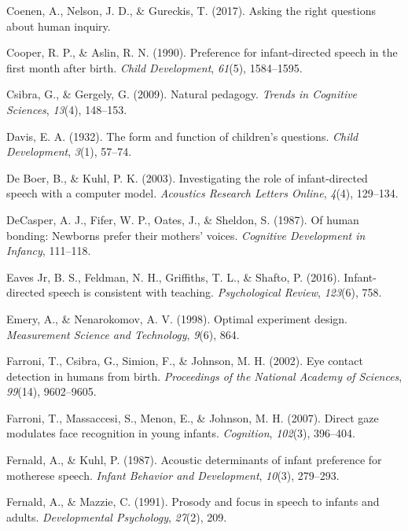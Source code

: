 \documentclass[a4paper,man,apacite,floatsintext]{apa6}
\begin{document}
\hypertarget{ref-coenen2017asking}{}
Coenen, A., Nelson, J. D., \& Gureckis, T. (2017). Asking the right
questions about human inquiry.

\hypertarget{ref-cooper1990preference}{}
Cooper, R. P., \& Aslin, R. N. (1990). Preference for infant-directed
speech in the first month after birth. \emph{Child Development},
\emph{61}(5), 1584--1595.

\hypertarget{ref-csibra2009natural}{}
Csibra, G., \& Gergely, G. (2009). Natural pedagogy. \emph{Trends in
Cognitive Sciences}, \emph{13}(4), 148--153.

\hypertarget{ref-davis1932form}{}
Davis, E. A. (1932). The form and function of children's questions.
\emph{Child Development}, \emph{3}(1), 57--74.

\hypertarget{ref-de2003investigating}{}
De Boer, B., \& Kuhl, P. K. (2003). Investigating the role of
infant-directed speech with a computer model. \emph{Acoustics Research
Letters Online}, \emph{4}(4), 129--134.

\hypertarget{ref-decasper1987human}{}
DeCasper, A. J., Fifer, W. P., Oates, J., \& Sheldon, S. (1987). Of
human bonding: Newborns prefer their mothers' voices. \emph{Cognitive
Development in Infancy}, 111--118.

\hypertarget{ref-eaves2016infant}{}
Eaves Jr, B. S., Feldman, N. H., Griffiths, T. L., \& Shafto, P. (2016).
Infant-directed speech is consistent with teaching. \emph{Psychological
Review}, \emph{123}(6), 758.

\hypertarget{ref-emery1998optimal}{}
Emery, A., \& Nenarokomov, A. V. (1998). Optimal experiment design.
\emph{Measurement Science and Technology}, \emph{9}(6), 864.

\hypertarget{ref-farroni2002eye}{}
Farroni, T., Csibra, G., Simion, F., \& Johnson, M. H. (2002). Eye
contact detection in humans from birth. \emph{Proceedings of the
National Academy of Sciences}, \emph{99}(14), 9602--9605.

\hypertarget{ref-farroni2007direct}{}
Farroni, T., Massaccesi, S., Menon, E., \& Johnson, M. H. (2007). Direct
gaze modulates face recognition in young infants. \emph{Cognition},
\emph{102}(3), 396--404.

\hypertarget{ref-fernald1987acoustic}{}
Fernald, A., \& Kuhl, P. (1987). Acoustic determinants of infant
preference for motherese speech. \emph{Infant Behavior and Development},
\emph{10}(3), 279--293.

\hypertarget{ref-fernald1991prosody}{}
Fernald, A., \& Mazzie, C. (1991). Prosody and focus in speech to
infants and adults. \emph{Developmental Psychology}, \emph{27}(2), 209.
\end{document}

